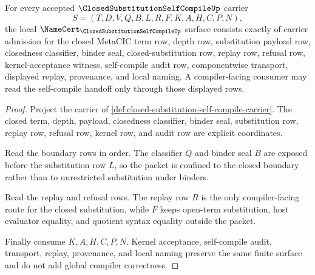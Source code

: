 \begin{theorem}
\label{thm:closed-substitution-self-compile-namecert-obligations}
For every accepted $\ClosedSubstitutionSelfCompileUp$ carrier
$$
S=(T,D,V,Q,B,L,R,F,K,A,H,C,P,N),
$$
the local $\NameCert_{\ClosedSubstitutionSelfCompileUp}$ surface consists exactly of carrier admission for the closed MetaCIC term row, depth row, substitution payload row, closedness classifier, binder seal, closed-substitution row, replay row, refusal row, kernel-acceptance witness, self-compile audit row, componentwise transport, displayed replay, provenance, and local naming. A compiler-facing consumer may read the self-compile handoff only through those displayed rows.
\end{theorem}
\begin{proof}
Project the carrier of \autoref{def:closed-substitution-self-compile-carrier}. The closed term, depth, payload, closedness classifier, binder seal, substitution row, replay row, refusal row, kernel row, and audit row are explicit coordinates.

Read the boundary rows in order. The classifier $Q$ and binder seal $B$ are exposed before the substitution row $L$, so the packet is confined to the closed boundary rather than to unrestricted substitution under binders.

Read the replay and refusal rows. The replay row $R$ is the only compiler-facing route for the closed substitution, while $F$ keeps open-term substitution, host evaluator equality, and quotient syntax equality outside the packet.

Finally consume $K,A,H,C,P,N$. Kernel acceptance, self-compile audit, transport, replay, provenance, and local naming preserve the same finite surface and do not add global compiler correctness.
\end{proof}

